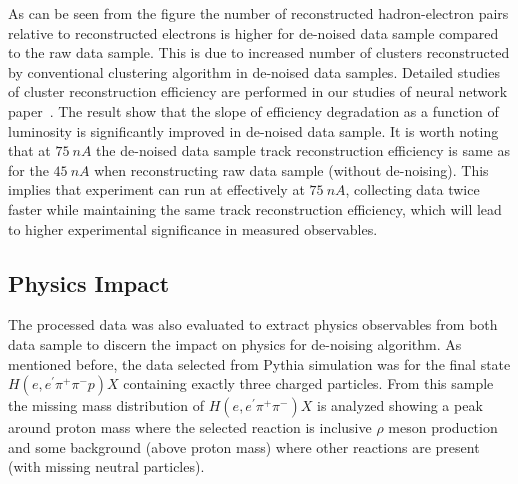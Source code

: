 As can be seen from the figure the number of reconstructed hadron-electron pairs relative to reconstructed electrons is higher for de-noised data sample compared to the raw data sample. This is due to increased number of clusters reconstructed by conventional clustering algorithm in de-noised data samples. Detailed studies of cluster reconstruction efficiency are performed 
in our studies of neural network paper~\cite{Thomadakis:2022zcd}. 
The result show that the slope of efficiency degradation as a function of luminosity is significantly improved in de-noised data sample. 
It is worth noting that at $75~nA$ the de-noised data sample track reconstruction efficiency is same as for the $45~nA$ when reconstructing raw data sample (without de-noising). This implies that experiment can run at effectively at $75~nA$, collecting data twice faster while maintaining the same track reconstruction efficiency, which will lead to higher experimental significance in measured observables.

\subsection{Physics Impact}

The processed data was also evaluated to extract physics observables from both data sample to discern the impact on physics for de-noising algorithm. As mentioned before, the data selected from Pythia simulation was for the final state $H(e,e^\prime\pi^+\pi^-p)X$ containing exactly three charged particles. From this sample the missing mass distribution of $H(e,e^\prime\pi^+\pi^-)X$ is analyzed showing a peak around proton mass where the selected reaction is inclusive $\rho$ meson production and some background (above proton mass) where other reactions  are present (with missing neutral particles).

